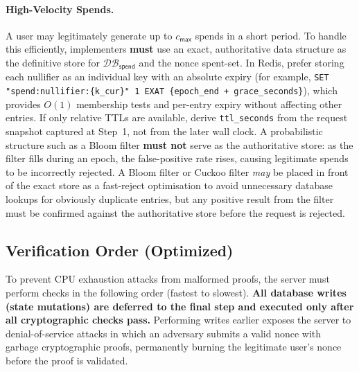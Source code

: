 \documentclass[11pt]{article}
\theoremstyle{definitionstyle}
\theoremstyle{plain}
\newcommand{\DB}{\mathcal{DB}}
\begin{document}
\paragraph{High-Velocity Spends.}
A user may legitimately generate up to $c_{\mathsf{max}}$ spends in a short period. To handle this efficiently, implementers \textbf{must} use an exact, authoritative data structure as the definitive store for $\DB_{\mathsf{spend}}$ and the nonce spent-set. In Redis, prefer storing each nullifier as an individual key with an absolute expiry (for example, \nolinkurl{SET "spend:nullifier:{k_cur}" 1 EXAT {epoch_end + grace_seconds}}), which provides $O(1)$ membership tests and per-entry expiry without affecting other entries. If only relative TTLs are available, derive \verb|ttl_seconds| from the request snapshot captured at Step~1, not from the later wall clock. A probabilistic structure such as a Bloom filter \textbf{must not} serve as the authoritative store: as the filter fills during an epoch, the false-positive rate rises, causing legitimate spends to be incorrectly rejected. A Bloom filter or Cuckoo filter \emph{may} be placed in front of the exact store as a fast-reject optimisation to avoid unnecessary database lookups for obviously duplicate entries, but any positive result from the filter must be confirmed against the authoritative store before the request is rejected.

\subsection{Verification Order (Optimized)}

To prevent CPU exhaustion attacks from malformed proofs, the server must perform checks in the following order (fastest to slowest). \textbf{All database writes (state mutations) are deferred to the final step and executed only after all cryptographic checks pass.} Performing writes earlier exposes the server to denial-of-service attacks in which an adversary submits a valid nonce with garbage cryptographic proofs, permanently burning the legitimate user's nonce before the proof is validated.
\end{document}
